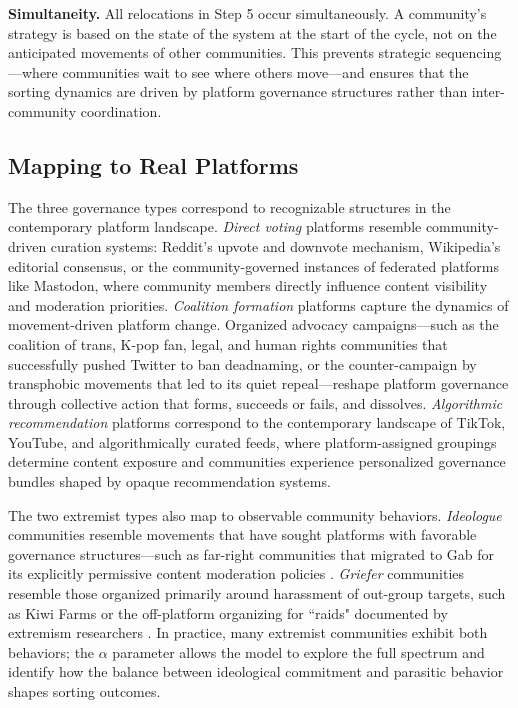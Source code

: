 \documentclass[12pt]{article}
\begin{document}
\textbf{Simultaneity.} All relocations in Step 5 occur simultaneously. A community's strategy is based on the state of the system at the start of the cycle, not on the anticipated movements of other communities. This prevents strategic sequencing---where communities wait to see where others move---and ensures that the sorting dynamics are driven by platform governance structures rather than inter-community coordination.

\subsection{Mapping to Real Platforms}
\label{sec:mapping}

The three governance types correspond to recognizable structures in the contemporary platform landscape. \textit{Direct voting} platforms resemble community-driven curation systems: Reddit's upvote and downvote mechanism, Wikipedia's editorial consensus, or the community-governed instances of federated platforms like Mastodon, where community members directly influence content visibility and moderation priorities. \textit{Coalition formation} platforms capture the dynamics of movement-driven platform change. Organized advocacy campaigns---such as the coalition of trans, K-pop fan, legal, and human rights communities that successfully pushed Twitter to ban deadnaming, or the counter-campaign by transphobic movements that led to its quiet repeal---reshape platform governance through collective action that forms, succeeds or fails, and dissolves. \textit{Algorithmic recommendation} platforms correspond to the contemporary landscape of TikTok, YouTube, and algorithmically curated feeds, where platform-assigned groupings determine content exposure and communities experience personalized governance bundles shaped by opaque recommendation systems.

The two extremist types also map to observable community behaviors. \textit{Ideologue} communities resemble movements that have sought platforms with favorable governance structures---such as far-right communities that migrated to Gab for its explicitly permissive content moderation policies \citep{jasserWelcomeGabFamFarright2023, dehghanPoliticizationRadicalizationDiscourses2022}. \textit{Griefer} communities resemble those organized primarily around harassment of out-group targets, such as Kiwi Farms or the off-platform organizing for ``raids" documented by extremism researchers \citep{lavin2020culture, gais2021encrypted}. In practice, many extremist communities exhibit both behaviors; the $\alpha$ parameter allows the model to explore the full spectrum and identify how the balance between ideological commitment and parasitic behavior shapes sorting outcomes.
\end{document}
